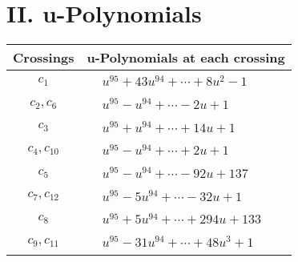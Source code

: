 \documentclass[1p]{elsarticle_modified}
\theoremstyle{definition}
\begin{document}
\newpage\renewcommand{\arraystretch}{1}
\centering \section*{ II. u-Polynomials}
\begin{tabular}{m{50pt}|m{274pt}}
Crossings & \hspace{64pt}u-Polynomials at each crossing \\
\hline $$\begin{aligned}c_{1}\end{aligned}$$&$\begin{aligned}
&u^{95}+43 u^{94}+\cdots+8 u^2-1
\end{aligned}$\\
\hline $$\begin{aligned}c_{2},c_{6}\end{aligned}$$&$\begin{aligned}
&u^{95}- u^{94}+\cdots-2 u+1
\end{aligned}$\\
\hline $$\begin{aligned}c_{3}\end{aligned}$$&$\begin{aligned}
&u^{95}+u^{94}+\cdots+14 u+1
\end{aligned}$\\
\hline $$\begin{aligned}c_{4},c_{10}\end{aligned}$$&$\begin{aligned}
&u^{95}- u^{94}+\cdots+2 u+1
\end{aligned}$\\
\hline $$\begin{aligned}c_{5}\end{aligned}$$&$\begin{aligned}
&u^{95}- u^{94}+\cdots-92 u+137
\end{aligned}$\\
\hline $$\begin{aligned}c_{7},c_{12}\end{aligned}$$&$\begin{aligned}
&u^{95}-5 u^{94}+\cdots-32 u+1
\end{aligned}$\\
\hline $$\begin{aligned}c_{8}\end{aligned}$$&$\begin{aligned}
&u^{95}+5 u^{94}+\cdots+294 u+133
\end{aligned}$\\
\hline $$\begin{aligned}c_{9},c_{11}\end{aligned}$$&$\begin{aligned}
&u^{95}-31 u^{94}+\cdots+48 u^3+1
\end{aligned}$\\
\hline
\end{tabular}\newpage\renewcommand{\arraystretch}{1}
\end{document}
